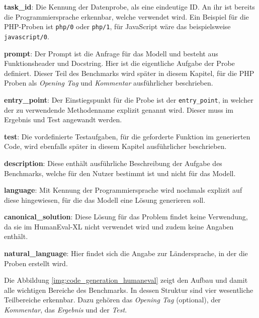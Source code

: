 \begin{myenumerate}
	\item \textbf{task\_id}: Die Kennung der Datenprobe, als eine eindeutige ID. An ihr ist bereits die Programmiersprache erkennbar, welche verwendet wird. Ein Beispiel für die PHP-Proben ist \texttt{php/0} oder \texttt{php/1}, für JavaScript wäre das beispielsweise \texttt{javascript/0}.
	\item \textbf{prompt}: Der Prompt ist die Anfrage für das Modell und besteht aus Funktionsheader und Docstring. Hier ist die eigentliche Aufgabe der Probe definiert. Dieser Teil des Benchmarks wird später in diesem Kapitel, für die PHP Proben als \textit{Opening Tag} und \textit{Kommentar} ausführlicher beschrieben.
	\item \textbf{entry\_point}: Der Einstiegspunkt für die Probe ist der \texttt{entry\_point}, in welcher der zu verwendende Methodenname explizit genannt wird. Dieser muss im Ergebnis und Test angewandt werden.
	\item \textbf{test}: Die vordefinierte Testaufgaben, für die geforderte Funktion im generierten Code, wird ebenfalls später in diesem Kapitel ausführlicher beschrieben.
	\item \textbf{description}: Diese enthält ausführliche Beschreibung der Aufgabe des Benchmarks, welche für den Nutzer bestimmt ist und nicht für das Modell.
	\item \textbf{language}: Mit Kennung der Programmiersprache wird nochmals explizit auf diese hingewiesen, für die das Modell eine Lösung generieren soll.
	\item \textbf{canonical\_solution}: Diese Lösung für das Problem findet keine Verwendung, da sie im HumanEval-XL nicht verwendet wird und zudem keine Angaben enthält.
	\item \textbf{natural\_language}: Hier findet sich die Angabe zur Ländersprache, in der die Proben erstellt wird.
\end{myenumerate}

Die Abbildung \ref{img:code_generation_humaneval} zeigt den Aufbau und damit alle wichtigen Bereiche des Benchmarks. In dessen Struktur sind vier wesentliche Teilbereiche erkennbar. Dazu gehören das \textit{Opening Tag} (optional), der \textit{Kommentar}, das \textit{Ergebnis} und der \textit{Test}.\vspace{0.2cm}

